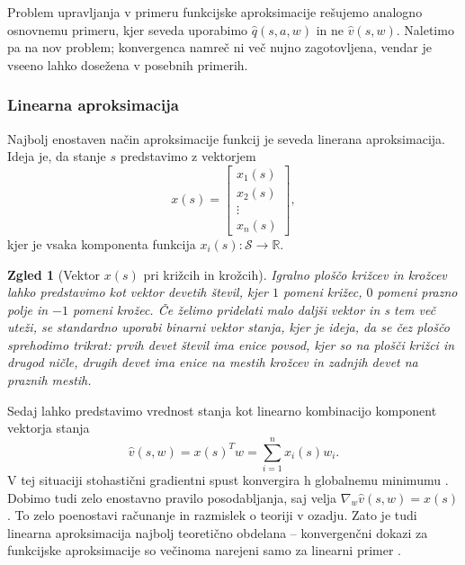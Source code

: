 \documentclass[12pt,a4paper]{amsart}
\theoremstyle{definition} %
\theoremstyle{plain} %
\newtheorem{zgled}[definicija]{Zgled}
\newcommand{\R}{\mathbb R}
\begin{document}
Problem upravljanja v primeru funkcijske aproksimacije rešujemo analogno osnovnemu primeru, kjer seveda 
uporabimo $\hat{q}(s, a, w)$ in ne $\hat{v}(s, w)$. Naletimo pa na nov problem; konvergenca namreč ni 
več nujno zagotovljena, vendar je vseeno lahko dosežena v posebnih primerih.

\subsubsection{Linearna aproksimacija}
Najbolj enostaven način aproksimacije funkcij je seveda linerana aproksimacija. Ideja je, da stanje 
$s$ predstavimo z vektorjem 
$$
x(s) = \begin{bmatrix}
    x_{1}(s) \\
    x_{2}(s) \\
    \vdots \\
    x_{n}(s)
  \end{bmatrix},
$$
kjer je vsaka komponenta funkcija $x_i(s): \mathcal{S} \rightarrow \R$.

\begin{zgled}[Vektor $x(s)$ pri križcih in krožcih]
\label{vektor-ttt}
    Igralno ploščo križcev in krožcev lahko predstavimo kot vektor devetih števil, kjer 
    $1$ pomeni križec, $0$ pomeni prazno polje in $-1$ pomeni krožec. Če želimo pridelati malo daljši 
    vektor in s tem več uteži, se standardno uporabi binarni vektor stanja, kjer je ideja, da se čez 
    ploščo sprehodimo trikrat: prvih devet števil ima enice povsod, kjer so na plošči križci in drugod 
    ničle, drugih devet ima enice na mestih krožcev in zadnjih devet na praznih mestih.
\end{zgled}

Sedaj lahko predstavimo vrednost stanja kot linearno kombinacijo komponent vektorja stanja
$$
\hat{v}(s, w) = x(s)^T w = \sum_{i=1}^n x_i(s) w_i.
$$
V tej situaciji stohastični gradientni spust konvergira h globalnemu minimumu \cite{RLintro}. Dobimo 
tudi zelo enostavno pravilo posodabljanja, saj velja $\nabla_w \hat{v}(s, w) = x(s)$. To zelo 
poenostavi računanje in razmislek o teoriji v ozadju. Zato je tudi linearna aproksimacija najbolj 
teoretično obdelana -- konvergenčni dokazi za funkcijske aproksimacije so večinoma narejeni samo 
za linearni primer \cite{RLalgo}.
\end{document}
